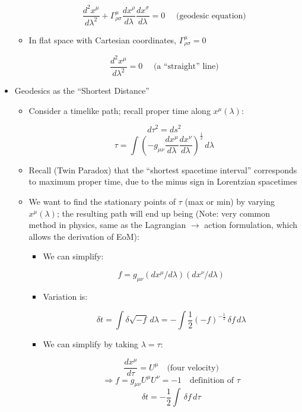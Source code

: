 \begin{itemize}
\begin{itemize}
        $$\frac{d^2x^{\mu}}{d\lambda^2}+\Gamma^{\mu}_{\rho\sigma}\frac{dx^{\rho}}{d\lambda}\frac{dx^{\sigma}}{d\lambda}=0\quad\text{ (geodesic equation)}$$

      \item In flat space with Cartesian coordinates, $\Gamma^{\mu}_{\rho\sigma}=0$

        $$\frac{d^2x^{\mu}}{d\lambda^2}=0\quad\text{ (a ``straight'' line)}$$

    \end{itemize}
    
  \item Geodesics as the ``Shortest Distance''

    \begin{itemize}
        
      \item Consider a timelike path; recall proper time along $x^{\mu}(\lambda)$:

        $$d\tau^2=ds^2$$
        $$\tau=\int\left(-g_{\mu\nu}\frac{dx^{\mu}}{d\lambda}\frac{dx^{\nu}}{d\lambda}\right)^{\frac{1}{2}}\,d\lambda$$

      \item Recall (Twin Paradox) that the ``shortest spacetime interval'' corresponds to maximum proper time, due to the minus sign in Lorentzian spacetimes

      \item We want to find the stationary points of $\tau$ (max or min) by varying $x^{\mu}(\lambda)$; the resulting path will end up being (Note: very common method in physics, same as the Lagrangian $\to$ action formulation, which allows the derivation of EoM):

        \begin{itemize}

          \item We can simplify:

            $$f=g_{\mu\nu}(dx^{\mu}/d\lambda)(dx^{\nu}/d\lambda)$$

          \item Variation is:

            $$\delta t=\int \delta\sqrt{-f}\,d\lambda=-\int\frac{1}{2}(-f)^{-\frac{1}{2}}\,\delta f\,d\lambda$$

          \item We can simplify by taking $\lambda=\tau$:

            $$\frac{dx^{\mu}}{d\tau}=U^{\mu}\quad\text{(four velocity)}$$
            $$\Rightarrow f=g_{\mu\nu}U^{\mu}U^{\nu}=-1\quad\text{definition of $\tau$}$$
            $$\delta t=-\frac{1}{2}\int\,\delta f\,d\tau$$


\end{itemize}
\end{itemize}
\end{itemize}
